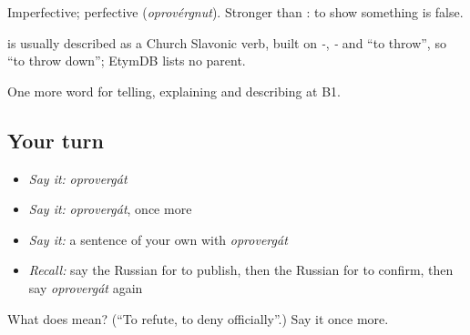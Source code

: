 Imperfective; perfective \emph{} (\emph{oprovérgnut}). Stronger than \emph{}: to show something is false.

\begin{cousinweb}
\emph{} is usually described as a Church Slavonic verb, built on \emph{-}, \emph{-} and \emph{} \textquotedblleft{}to throw\textquotedblright{}, so \textquotedblleft{}to throw down\textquotedblright{}; EtymDB lists no parent.
\end{cousinweb}

\begin{grammarlens}[title={What you've built}]
One more word for telling, explaining and describing at B1.
\end{grammarlens}

\subsection*{Your turn}
\begin{itemize}
\raggedright
  \item \emph{Say it:} \emph{oprovergát}
  \item \emph{Say it:} \emph{oprovergát}, once more
  \item \emph{Say it:} a sentence of your own with \emph{oprovergát}
  \item \emph{Recall:} say the Russian for to publish, then the Russian for to confirm, then say \emph{oprovergát} again
\end{itemize}

\begin{tcolorbox}[breakable,colback=teal!4,colframe=teal!35!black,title={Before you move on}]
What does  mean? (\textquotedblleft{}To refute, to deny officially\textquotedblright{}.) Say it once more.
\end{tcolorbox}
